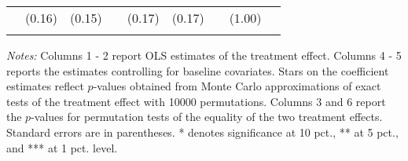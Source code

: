 \begin{table}[h]
{\begin{threeparttable}
\begin{tabular}{l*{8}{c}}
          &   (0.16)&   (0.15)&         &   (0.17)&   (0.17)&         &   (1.00)&         \\
          &         &         &         &         &         &         &         &         \\
\bottomrule \end{tabular} \begin{tablenotes}[flushleft] \footnotesize \item \emph{Notes:} Columns 1 - 2 report OLS estimates of the treatment effect. Columns 4 - 5 reports the estimates controlling for baseline covariates. Stars on the coefficient estimates reflect \(p\)-values obtained from Monte Carlo approximations of exact tests of the treatment effect with 10000 permutations. Columns 3 and 6 report the \(p\)-values for permutation tests of the equality of the two treatment effects. Standard errors are in parentheses. * denotes significance at 10 pct., ** at 5 pct., and *** at 1 pct. level. \end{tablenotes} \end{threeparttable} } \end{table}

